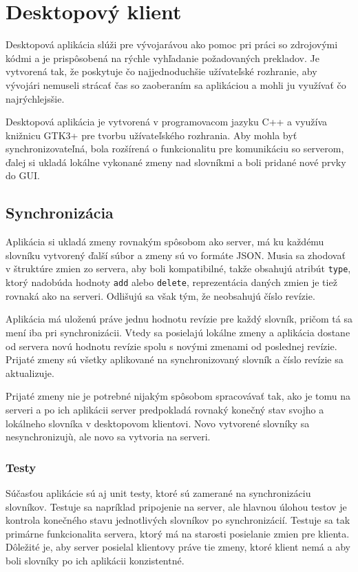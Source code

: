 \documentclass[
  digital, %
  table,   %
  lof,     %
  lot,     %
]{fithesis3}
\begin{document}
\chapter{Desktopový klient}
Desktopová aplikácia slúži pre vývojarávou ako pomoc pri práci so zdrojovými kódmi a je prispôsobená na rýchle vyhľadanie požadovaných prekladov. Je vytvorená tak, že poskytuje čo najjednoduchšie užívateľské rozhranie, aby vývojári nemuseli strácať čas so zaoberaním sa aplikáciou a mohli ju využívať čo najrýchlejsšie.

Desktopová aplikácia je vytvorená v programovacom jazyku C++ a využíva knižnicu GTK3+ pre tvorbu užívateľského rozhrania. Aby mohla byť synchronizovateľná, bola rozšírená o funkcionalitu pre komunikáciu so serverom, ďalej si ukladá lokálne vykonané zmeny nad slovníkmi a boli pridané nové prvky do GUI.

\section{Synchronizácia}
Aplikácia si ukladá zmeny rovnakým spôsobom ako server, má ku každému slovníku vytvorený ďalší súbor a zmeny sú vo formáte JSON. Musia sa zhodovať v štruktúre zmien zo servera, aby boli kompatibilné, takže obsahujú atribút \texttt{type}, ktorý nadobúda hodnoty \texttt{add} alebo \texttt{delete}, reprezentácia daných zmien je tiež rovnaká ako na serveri. Odlišujú sa však tým, že neobsahujú číslo revízie.

Aplikácia má uloženú práve jednu hodnotu revízie pre každý slovník, pričom tá sa mení iba pri synchronizácii. Vtedy sa posielajú lokálne zmeny a aplikácia dostane od servera novú hodnotu revízie spolu s novými zmenami od poslednej revízie. Prijaté zmeny sú všetky aplikované na synchronizovaný slovník a číslo revízie sa aktualizuje.

Prijaté zmeny nie je potrebné nijakým spôsobom spracovávať tak, ako je tomu na serveri a po ich aplikácii server predpokladá rovnaký konečný stav svojho a lokálneho slovníka v desktopovom klientovi. Novo vytvorené slovníky sa nesynchronizujù, ale novo sa vytvoria na serveri.

\subsection{Testy}
Súčasťou aplikácie sú aj unit testy, ktoré sú zamerané na synchronizáciu slovníkov. Testuje sa napríklad pripojenie na server, ale hlavnou úlohou testov je kontrola konečného stavu jednotlivých slovníkov po synchronizácií. Testuje sa tak primárne funkcionalita servera, ktorý má na starosti posielanie zmien pre klienta. Dôležité je, aby server posielal klientovy práve tie zmeny, ktoré klient nemá a aby boli slovníky po ich aplikácii konzistentné.
\end{document}
